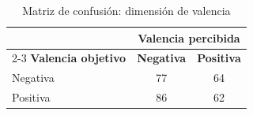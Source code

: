 \begin{table}[htbp]
\centering
\caption{Matriz de confusión: dimensión de valencia}
\label{tab:confusion_valencia}
\begin{tabular}{lcc}
\toprule
& \multicolumn{2}{c}{\textbf{Valencia percibida}} \\
\cmidrule{2-3}
\textbf{Valencia objetivo} & \textbf{Negativa} & \textbf{Positiva} \\
\midrule
Negativa & 77 & 64 \\
Positiva & 86 & 62 \\
\bottomrule
\end{tabular}
\end{table}

